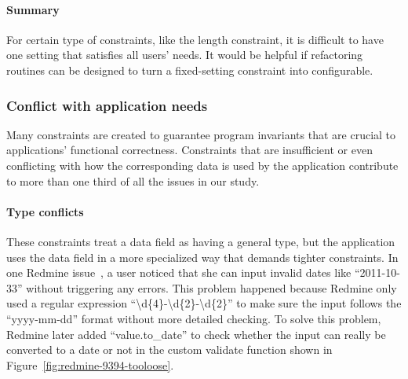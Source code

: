 \paragraph{\bf Summary}  For certain type of constraints, like the
length constraint, it is difficult to have one setting that satisfies all users' needs. It would be helpful if refactoring routines can be designed to turn a fixed-setting constraint into configurable. %


\subsubsection{{Conflict with application needs}}
\label{sec:what_app}
Many constraints are created to guarantee program invariants
that are crucial to applications' functional correctness. 
Constraints that are insufficient or even conflicting with how the corresponding
data is used by the application contribute to more than one third of all the issues
in our study.

\paragraph{\textbf{Type conflicts}}
These constraints treat a data field as having a general type, but
the application uses the data field in a more specialized way
that demands tighter constraints. In one Redmine issue~\cite{redmine-9394}, a user noticed that she can input  invalid dates like
``2011-10-33'' without triggering any errors. 
This problem happened because Redmine only used a regular expression ``\textbackslash d\{4\}-\textbackslash d\{2\}-\textbackslash d\{2\}\textdollar'' to make sure the input follows the ``yyyy-mm-dd'' format without more detailed checking.
To solve this problem, Redmine later added ``value.to\_date'' to check whether the input   can really be converted to a date or not in the custom validate function shown in Figure~\ref{fig:redmine-9394-tooloose}.  

